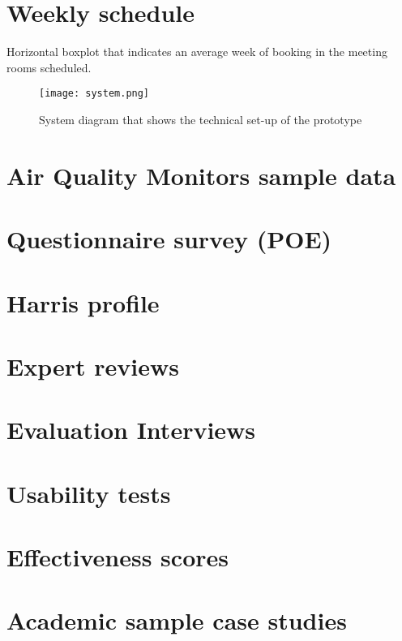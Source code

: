 \begin{appendices}
\section{Weekly schedule}
\label{appendix:schedule}

Horizontal boxplot that indicates an average week of booking in the meeting rooms scheduled.

\begin{figure}[H]
    \centering
    \texttt{[image: system.png]}
    \caption{System diagram that shows the technical set-up of the prototype}
    \label{fig:timeline}
\end{figure}

\pagebreak

\section{Air Quality Monitors sample data}
\label{appendix:monitors}

\section{Questionnaire survey (POE)}
\label{appendix:survey}

\section{Harris profile}
\label{appendix:profile}

\section{Expert reviews}
\label{appendix:expert}

\section{Evaluation Interviews}
\label{appendix:evaluation}

\section{Usability tests}
\label{appendix:usability}

\section{Effectiveness scores}
\label{appendix:effectiveness}

\section{Academic sample case studies}
\label{appendix:academic}


\end{appendices}
